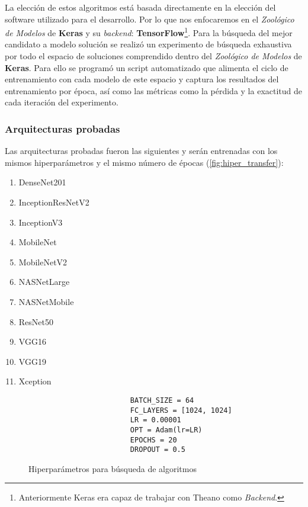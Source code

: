 La elección de estos algoritmos está basada directamente en la elección del
software utilizado para el desarrollo. Por lo que nos enfocaremos en el
\emph{Zoológico de Modelos} de \textbf{Keras} y su \emph{backend}:
\textbf{TensorFlow}\footnote{Anteriormente Keras era capaz de trabajar con
Theano como \emph{Backend}.}. Para la búsqueda del mejor candidato a modelo solución se
realizó un experimento de búsqueda exhaustiva por todo el espacio de soluciones
comprendido dentro del \emph{Zoológico de Modelos} de \textbf{Keras}. Para ello
se programó un script automatizado que alimenta el ciclo de entrenamiento con
cada modelo de este espacio y captura los resultados del entrenamiento por
época, así como las métricas como la pérdida y la exactitud de cada iteración
del experimento.

\subsubsection{Arquitecturas probadas}

Las arquitecturas probadas fueron las siguientes y serán entrenadas con los
mismos hiperparámetros y el mismo número de épocas
(\autoref{fig:hiper_transfer}):

\begin{enumerate}
    \item DenseNet201
    \item InceptionResNetV2
    \item InceptionV3
    \item MobileNet
    \item MobileNetV2
    \item NASNetLarge
    \item NASNetMobile
    \item ResNet50
    \item VGG16
    \item VGG19
    \item Xception
\end{enumerate}

\begin{figure}[H]
    \centering
    \begin{verbatim}
                        BATCH_SIZE = 64
                        FC_LAYERS = [1024, 1024]
                        LR = 0.00001
                        OPT = Adam(lr=LR)
                        EPOCHS = 20
                        DROPOUT = 0.5
    \end{verbatim}
    \caption{Hiperparámetros para búsqueda de algoritmos}\label{fig:hiper_transfer}
\end{figure}

